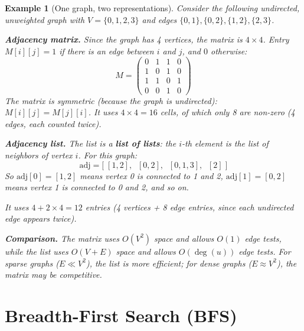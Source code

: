 \documentclass[11pt,a4paper]{article}
\newtheorem{example}[theorem]{Example}
\begin{document}
\begin{example}[One graph, two representations]
Consider the following undirected, unweighted graph with $V = \{0, 1, 2, 3\}$ and edges $\{0,1\}, \{0,2\}, \{1,2\}, \{2,3\}$.

\begin{center}
\end{center}

\textbf{Adjacency matrix.} Since the graph has 4 vertices, the matrix is $4 \times 4$. Entry $M[i][j] = 1$ if there is an edge between $i$ and $j$, and $0$ otherwise:
\[
M =
\begin{pmatrix}
0 & 1 & 1 & 0 \\
1 & 0 & 1 & 0 \\
1 & 1 & 0 & 1 \\
0 & 0 & 1 & 0
\end{pmatrix}
\]
The matrix is symmetric (because the graph is undirected): $M[i][j] = M[j][i]$. It uses $4 \times 4 = 16$ cells, of which only 8 are non-zero (4 edges, each counted twice).

\textbf{Adjacency list.} The list is a \textbf{list of lists}: the $i$-th element is the list of neighbors of vertex $i$. For this graph:
\[
\mathrm{adj} = \bigl[\;[1, 2],\;\; [0, 2],\;\; [0, 1, 3],\;\; [2]\;\bigr]
\]
So $\mathrm{adj}[0] = [1, 2]$ means vertex 0 is connected to 1 and 2, $\mathrm{adj}[1] = [0, 2]$ means vertex 1 is connected to 0 and 2, and so on.

It uses $4 + 2 \times 4 = 12$ entries (4 vertices + 8 edge entries, since each undirected edge appears twice).

\textbf{Comparison.} The matrix uses $O(V^2)$ space and allows $O(1)$ edge tests, while the list uses $O(V + E)$ space and allows $O(\deg(u))$ edge tests. For sparse graphs ($E \ll V^2$), the list is more efficient; for dense graphs ($E \approx V^2$), the matrix may be competitive.
\end{example}

\section{Breadth-First Search (BFS)}
\end{document}
